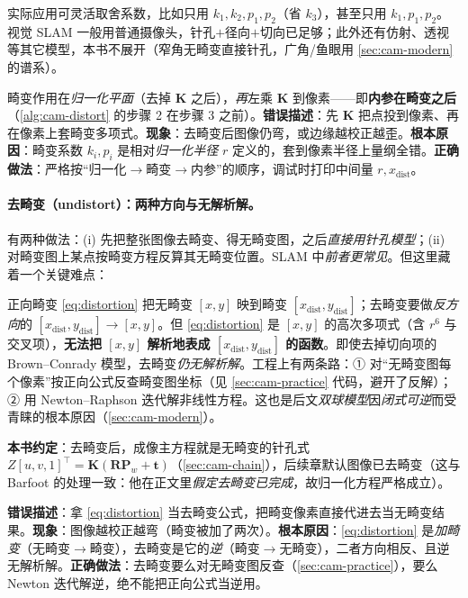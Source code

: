 \noindent 实际应用可灵活取舍系数，比如只用 $k_1,k_2,p_1,p_2$（省 $k_3$），甚至只用 $k_1,p_1,p_2$\cite{gaoxiang2019slam14}。视觉 SLAM 一般用普通摄像头，针孔$+$径向$+$切向已足够；此外还有仿射、透视等其它模型，本书不展开（窄角无畸变直接针孔，广角/鱼眼用 \cref{sec:cam-modern} 的谱系）。

\begin{pitfall}[畸变的作用顺序]
畸变作用在\emph{归一化平面}（去掉 $\mathbf{K}$ 之后），\emph{再}左乘 $\mathbf{K}$ 到像素——即\textbf{内参在畸变之后}（\cref{alg:cam-distort} 的步骤 2 在步骤 3 之前）。\textbf{错误描述}：先 $\mathbf{K}$ 把点投到像素、再在像素上套畸变多项式。\textbf{现象}：去畸变后图像仍弯，或边缘越校正越歪。\textbf{根本原因}：畸变系数 $k_i,p_i$ 是相对\emph{归一化半径} $r$ 定义的，套到像素半径上量纲全错。\textbf{正确做法}：严格按“归一化$\to$畸变$\to$内参”的顺序，调试时打印中间量 $r,x_{\text{dist}}$。
\end{pitfall}

\paragraph{去畸变（undistort）：两种方向与无解析解。}
有两种做法\cite{gaoxiang2019slam14}：(i) 先把整张图像去畸变、得无畸变图，之后\emph{直接用针孔模型}；(ii) 对畸变图上某点按畸变方程反算其无畸变位置。SLAM 中\emph{前者更常见}。但这里藏着一个关键难点：

\begin{insight}[径向-切向模型的去畸变没有解析解]
正向畸变 \cref{eq:distortion} 把无畸变 $[x,y]$ 映到畸变 $[x_{\text{dist}},y_{\text{dist}}]$；去畸变要做\emph{反方向}的 $[x_{\text{dist}},y_{\text{dist}}]\to[x,y]$。但 \cref{eq:distortion} 是 $[x,y]$ 的高次多项式（含 $r^6$ 与交叉项），\textbf{无法把 $[x,y]$ 解析地表成 $[x_{\text{dist}},y_{\text{dist}}]$ 的函数}\cite{carlone2026handbook}。即使去掉切向项的 Brown--Conrady 模型，去畸变\emph{仍无解析解}。工程上有两条路：① 对“无畸变图每个像素”按正向公式反查畸变图坐标（见 \cref{sec:cam-practice} 代码，避开了反解）；② 用 Newton--Raphson 迭代解非线性方程。这也是后文\emph{双球模型}因\emph{闭式可逆}而受青睐的根本原因（\cref{sec:cam-modern}）。
\end{insight}

\textbf{本书约定}：去畸变后，成像主方程就是无畸变的针孔式 $Z[u,v,1]^\top=\mathbf{K}(\mathbf{R}\mathbf{P}_w+\mathbf{t})$（\cref{sec:cam-chain}），后续章默认图像已去畸变（这与 Barfoot 的处理一致：他在正文里\emph{假定去畸变已完成}，故归一化方程严格成立\cite{barfoot2024state}）。

\begin{pitfall}
\textbf{错误描述}：拿 \cref{eq:distortion} 当去畸变公式，把畸变像素直接代进去当无畸变结果。\textbf{现象}：图像越校正越弯（畸变被加了两次）。\textbf{根本原因}：\cref{eq:distortion} 是\emph{加畸变}（无畸变$\to$畸变），去畸变是它的\emph{逆}（畸变$\to$无畸变），二者方向相反、且逆无解析解。\textbf{正确做法}：去畸变要么对无畸变图反查（\cref{sec:cam-practice}），要么 Newton 迭代解逆，绝不能把正向公式当逆用。
\end{pitfall}

